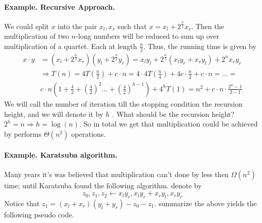 \paragraph{Example. Recursive Approach.} We could split \(x\) into the pair \(x_{l}, x_{r}\) such that \(x = x_{l} + 2^{\frac{n}{2}}x_{r} \). Then the multiplication of two \(n\)-long numbers will be reduced to sum up over multiplication of a quartet. Each at length \(\frac{n}{2}\). Thus, the running time is given by \begin{equation*}
    \begin{split}
 x\cdot y & = \left(x_{l} + 2^{\frac{n}{2}}x_{r}\right)\left(y_{l} + 2^{\frac{n}{2}}y_{r}\right) = x_{l}y_{l} + 2^{\frac{n}{2}} \left( x_{l}y_{r} + x_{r}y_{l} \right) + 2^{n}x_{r}y_{r} \\ &  \Rightarrow T\left(n\right)  =4T\left(\frac{n}{2}\right)+c\cdot n=4\cdot4T\left(\frac{n}{4}\right)+4c\cdot\frac{n}{2}+c\cdot n = ... = \\ & c\cdot n\left(1+\frac{4}{2}+\left(\frac{4}{2}\right)^{2}...+\left(\frac{4}{2}\right)^{h-1}\right) + 4^{h}T(1) = n^{2} + c\cdot n\cdot\frac{2^{h}-1}{2-1}
    \end{split}
\end{equation*}
We will call the number of iteration till the stopping condition the recursion height, and we will denote it by \(h\) . What should be the recursion height? \( 2^{h} = n \Rightarrow h =\log\left(n\right) \). So in total we get that multiplication could be achieved by performs \( \Theta\left(n^2\right)\) operations. 
\paragraph{Example. Karatsuba algorithm.} Many years it's was believed that multiplication can't done by less then \( \Omega \left( n^2 \right) \) time; until Karatsuba found the following algorithm. denote by \begin{equation*}
z_0, z_1, z_2 \leftarrow x_{l}y_{r}, x_{l}y_{r} + x_{r}y_{l}, x_{r}y_{r}
\end{equation*}Notice that \( z_1 = \left(x_{l}+x_{r}\right)\left(y_{l}+y_{r}\right) - z_{0} -z_{1} \). summarize the above yields the following pseudo code. 

